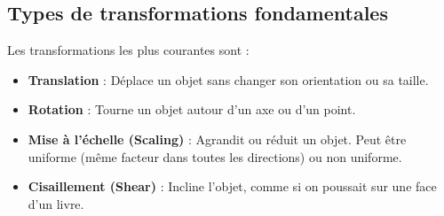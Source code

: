 \subsection{Types de transformations fondamentales}
Les transformations les plus courantes sont :
\begin{itemize}
    \item \textbf{Translation} : Déplace un objet sans changer son orientation ou sa taille.
    \item \textbf{Rotation} : Tourne un objet autour d'un axe ou d'un point.
    \item \textbf{Mise à l'échelle (Scaling)} : Agrandit ou réduit un objet. Peut être uniforme (même facteur dans toutes les directions) ou non uniforme.
    \item \textbf{Cisaillement (Shear)} : Incline l'objet, comme si on poussait sur une face d'un livre.
\end{itemize}
